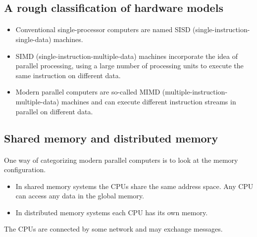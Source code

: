 \subsection*{A rough classification of hardware models}

\paragraph{}

\begin{itemize}
\item Conventional single-processor computers are named SISD (single-instruction-single-data) machines.

\item SIMD (single-instruction-multiple-data) machines incorporate the idea of parallel processing, using a large number of processing units to execute the same instruction on different data.

\item Modern parallel computers are so-called MIMD (multiple-instruction-multiple-data) machines and can execute different instruction streams in parallel on different data.
\end{itemize}

\noindent



\subsection*{Shared memory and distributed memory}

\paragraph{}
One way of categorizing modern parallel computers is to look at the memory configuration.
\begin{itemize}
\item In shared memory systems the CPUs share the same address space. Any CPU can access any data in the global memory.

\item In distributed memory systems each CPU has its own memory.
\end{itemize}

\noindent
The CPUs are connected by some network and may exchange messages.



